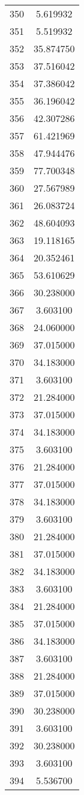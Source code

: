 \documentclass[12pt]{article}
\begin{document}
\begin{longtable}{@{}cc@{}}
350 & 5.619932 \\
351 & 5.519932 \\
352 & 35.874750 \\
353 & 37.516042 \\
354 & 37.386042 \\
355 & 36.196042 \\
356 & 42.307286 \\
357 & 61.421969 \\
358 & 47.944476 \\
359 & 77.700348 \\
360 & 27.567989 \\
361 & 26.083724 \\
362 & 48.604093 \\
363 & 19.118165 \\
364 & 20.352461 \\
365 & 53.610629 \\
366 & 30.238000 \\
367 & 3.603100 \\
368 & 24.060000 \\
369 & 37.015000 \\
370 & 34.183000 \\
371 & 3.603100 \\
372 & 21.284000 \\
373 & 37.015000 \\
374 & 34.183000 \\
375 & 3.603100 \\
376 & 21.284000 \\
377 & 37.015000 \\
378 & 34.183000 \\
379 & 3.603100 \\
380 & 21.284000 \\
381 & 37.015000 \\
382 & 34.183000 \\
383 & 3.603100 \\
384 & 21.284000 \\
385 & 37.015000 \\
386 & 34.183000 \\
387 & 3.603100 \\
388 & 21.284000 \\
389 & 37.015000 \\
390 & 30.238000 \\
391 & 3.603100 \\
392 & 30.238000 \\
393 & 3.603100 \\
394 & 5.536700 \\

\end{longtable}
\end{document}
